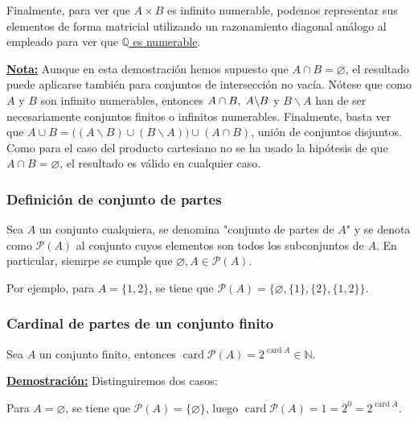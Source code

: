 \documentclass[12pt,a4paper]{article}
\newcommand{\card}{\operatorname{card}}
\newcommand{\N}{\mathbb{N}}
\newcommand{\Q}{\mathbb{Q}}
\newcommand{\dem}{
    \noindent \underline{\textbf{Demostración:}}
}
\newcommand{\nota}{
    \noindent \underline{\textbf{Nota:}}
}
\begin{document}
\vspace{4mm}
Finalmente, para ver que $A \times B$ es infinito numerable, podemos representar sus elementos de forma matricial
utilizando un razonamiento diagonal análogo al empleado para ver que \hyperref[racionales-numerables]{$\Q$ es numerable}.

\vspace{6mm}
\nota Aunque en esta demostración hemos supuesto que $A \cap B = \varnothing$, el resultado puede aplicarse también para conjuntos
de intersección no vacía. Nótese que como $A$ y $B$ son infinito numerables, entonces $A \cap B, \hspace{1mm} A \backslash B$ y $B \backslash A$
han de ser necesariamente conjuntos finitos o infinitos numerables. Finalmente, basta ver que
$A \cup B =\big((A\backslash B) \cup (B \backslash A) \big) \cup (A \cap B)$, unión de conjuntos disjuntos.
Como para el caso del producto cartesiano no se ha usado la hipótesis
de que $A \cap B = \varnothing$, el resultado es válido en cualquier caso.

\vspace{6mm}
\subsubsection{Definición de conjunto de partes}
\hspace{3mm}
Sea $A$ un conjunto cualquiera, se denomina "conjunto de partes de $A$" y se denota como $\mathcal{P}(A)$
al conjunto cuyos elementos son todos los subconjuntos de $A$. En particular, siemrpe se cumple
que $\varnothing, A \in \mathcal{P}(A)$.

\vspace{2mm} \noindent
Por ejemplo, para $A = \{1,2\}$, se tiene que $\mathcal{P}(A) = \big\{\varnothing, \{1\}, \{2\}, \{1,2\} \big\}$.

\subsubsection{Cardinal de partes de un conjunto finito}
\hspace{3mm}
Sea $A$ un conjunto finito, entonces $\card \mathcal{P}(A) = 2^{\text{} \card A} \in \N$.

\vspace{4mm}
\dem Distinguiremos dos casos:

\vspace{2mm} \noindent
Para $A = \varnothing$, se tiene que $\mathcal{P}(A) = \{\varnothing\}$, luego $\card \mathcal{P}(A) = 1 = 2^0 = 2^{\text{} \card A}$.
\end{document}
